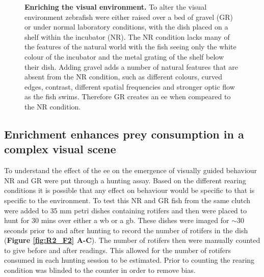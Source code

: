 \begin{figure}[!ht]
            \caption[\textbf{\label{fig:R2_F1}Enriching the visual environment.}]{ \textbf{\label{fig:R2_F1} Enriching the visual environment.} To alter the visual environment zebrafish were either raised over a bed of gravel (GR) or under normal laboratory conditions, with the dish placed on a shelf within the incubator (NR). The NR condition lacks many of the features of the natural world with the fish seeing only the white colour of the incubator and the metal grating of the shelf below their dish.  Adding gravel adds a number of natural features that are absent from the NR condition, such as different colours, curved edges, contrast, different spatial frequencies and stronger optic flow as the fish swims. Therefore GR creates an \gls{ee} when compeared to the NR condition.}
      \end{figure}
      



\subsection{Enrichment enhances prey consumption in a complex visual scene}
To understand the effect of the \gls{ee} on the emergence of visually guided behaviour NR and GR were put through a hunting assay. Based on the different rearing conditions it is possible that any effect on behaviour would be specific to that is specific to the environment. To test this NR and GR fish from the same clutch were added to 35 mm petri dishes containing rotifers and then were placed to hunt for 30 mins over either a \gls{wb} or a \gls{gb}. These dishes were imaged for $\sim$30 seconds prior to and after hunting to record the number of rotifers in the dish (\textbf{Figure \ref{fig:R2_F2} A-C}). The number of rotifers then were manually counted to give before and after readings. This allowed for the number of rotifers consumed in each hunting session to be estimated. Prior to counting the rearing condition was blinded to the counter in order to remove bias.

